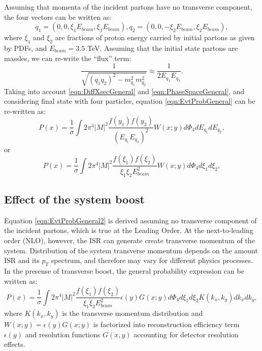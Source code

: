 \documentclass{cmspaper}
\begin{document}
Assuming that momenta of the incident partons have no transverse component, the four vectors can be written as:
\begin{equation}
q_{1}=(0,0,\xi_{1}E_{beam},\xi_{1}E_{beam}),
q_{2}=(0,0,-\xi_{2}E_{beam},\xi_{2}E_{beam}),
\label{eqn:EvtProbGeneral2}  
\end{equation}
where $\xi_{1}$ and $\xi_{2}$ are fractions of proton energy carried by initial partons as given by PDFs, and $E_{beam}=3.5$ TeV. Assuming 
that the initial state partons are massles, we can re-write the ``flux'' term:
\begin{equation}
\frac{1}{\sqrt{(q_{1}q_{2})^{2}-m_{q_{1}}^{2}m_{q_{2}}^{2}}} \approx \frac{1}{2 E_{q_{1}}E_{q_{2}}}.
\label{eqn:flux}  
\end{equation}
Taking into account \ref{eqn:DiffXsecGeneral} and \ref{eqn:PhaseSpaceGeneral}, and considering final state with four particles,
 equation \ref{eqn:EvtProbGeneral} can be re-written as:
\begin{equation}
P(x)=\frac{1}{ \sigma}\int 2 \pi^{4} \left| M \right|^{2} \frac{f(y_{1})f(y_{2})}{(E_{q_{1}}E_{q_{2}})^{2}}W(x;y)d\Phi_{4}dE_{q_{1}}dE_{q_{2}},
\label{eqn:EvtProbGeneral2}  
\end{equation}
or
\begin{equation}
P(x)=\frac{1}{\sigma }\int 2 \pi^{4} \left| M \right|^{2} \frac{f(\xi_{1})f(\xi_{2})}{\xi_{1}\xi_{2}E_{beam}^{2}}W(x;y)d\Phi_{4}d\xi_{1}d\xi_{2},
\label{eqn:EvtProbGeneral2}  
\end{equation}

\subsection{Effect of the system boost}
Equation \ref{eqn:EvtProbGeneral2} is derived assuming no transverse component of the incident partons, which is true at the Leading Order. 
At the next-to-leading order (NLO), however, the ISR can generate create transverse momentum of the system. Distribution of the system
transverse momentum depends on the amount ISR and its $p_{T}$ spectrum, and therefore may vary for different physics processes. In the 
presense of transverse boost, the general probability expression can be written as:
\begin{equation}
P(x)=\frac{1}{\sigma }\int 2 \pi^{4} \left| M \right|^{2} \frac{f(\xi_{1})f(\xi_{2})}{\xi_{1}\xi_{2}E_{beam}^{2}}\epsilon(y)G(x;y)d\Phi_{4}d\xi_{1}d\xi_{2}K(k_{x},k_{y})dk_{x}dk_{y},
\label{eqn:EvtProbGeneralWithBoost}  
\end{equation}
where $K(k_{x},k_{y})$ is the transverse momentum distribution and $W(x;y)=\epsilon(y)G(x;y)$ is factorized into reconstruction efficiency term $\epsilon(y)$
and resolution functions $G(x,y)$ accounting for detector resolution effects. 
\end{document}
